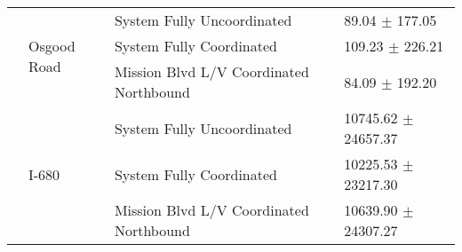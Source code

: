 \begin{tabular}{llll}
 & \multirow[t]{3}{*}{Osgood Road} & System Fully Uncoordinated & 89.04 $\pm$ 177.05 \\
 &  & System Fully Coordinated & 109.23 $\pm$ 226.21 \\
 &  & Mission Blvd L/V Coordinated Northbound & 84.09 $\pm$ 192.20 \\
 & \multirow[t]{3}{*}{I-680} & System Fully Uncoordinated & 10745.62 $\pm$ 24657.37 \\
 &  & System Fully Coordinated & 10225.53 $\pm$ 23217.30 \\
 &  & Mission Blvd L/V Coordinated Northbound & 10639.90 $\pm$ 24307.27 \\
\bottomrule
\end{tabular}
